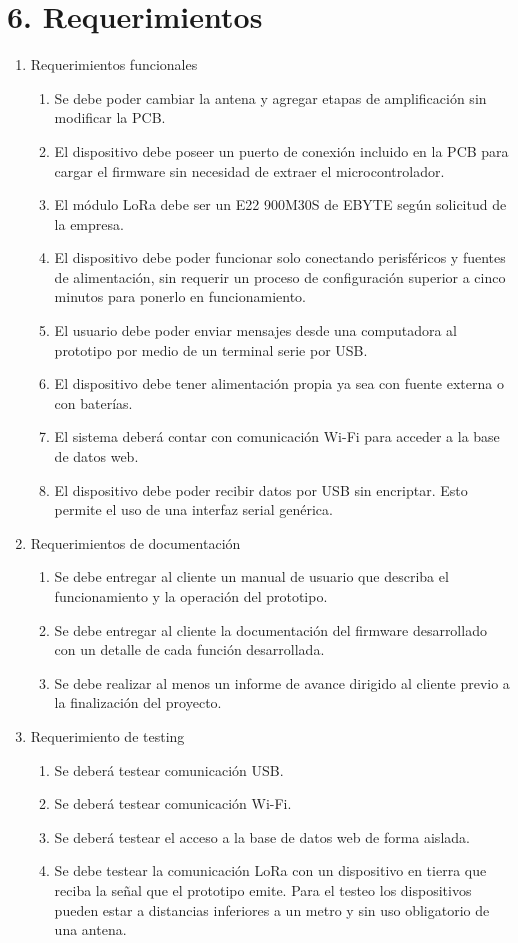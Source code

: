 \documentclass[
11pt, %
codirector, %
]{charter}
\begin{document}
\section{6. Requerimientos}
\label{sec:requerimientos}

\begin{enumerate}
	\item Requerimientos funcionales
		\begin{enumerate}
			\item Se debe poder cambiar la antena y agregar etapas de amplificación sin modificar la PCB.
			\item El dispositivo debe poseer un puerto de conexión incluido en la PCB para cargar el firmware sin necesidad de extraer el microcontrolador.
			\item El módulo LoRa debe ser un E22 900M30S de EBYTE según solicitud de la empresa.
			\item El dispositivo debe poder funcionar solo conectando perisféricos y fuentes de alimentación, sin requerir un proceso de configuración superior a cinco minutos para ponerlo en funcionamiento.
			\item El usuario debe poder enviar mensajes desde una computadora al prototipo por medio de un terminal serie por USB.
			\item El dispositivo debe tener alimentación propia ya sea con fuente externa o con baterías.
			\item El sistema deberá contar con comunicación Wi-Fi para acceder a la base de datos web.
			\item El dispositivo debe poder recibir datos por USB sin encriptar. Esto permite el uso de una interfaz serial genérica.
		\end{enumerate}
	\item Requerimientos de documentación
		\begin{enumerate}
			\item Se debe entregar al cliente un manual de usuario que describa el funcionamiento y la operación del prototipo.
			\item Se debe entregar al cliente la documentación del firmware desarrollado con un detalle de cada función desarrollada.
			\item Se debe realizar al menos un informe de avance dirigido al cliente previo a la finalización del proyecto.
		\end{enumerate}
	\item Requerimiento de testing
		\begin{enumerate}
			\item Se deberá testear comunicación USB.
			\item Se deberá testear comunicación Wi-Fi.
			\item Se deberá testear el acceso a la base de datos web de forma aislada.
			\item Se debe testear la comunicación LoRa con un dispositivo en tierra que reciba la señal que el prototipo emite. Para el testeo los dispositivos pueden estar a distancias inferiores a un metro y sin uso obligatorio de una antena.
		\end{enumerate}
\end{enumerate}
\end{document}
